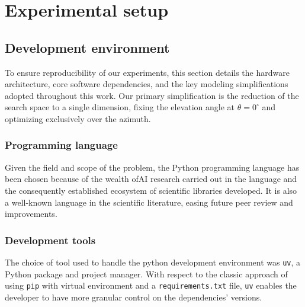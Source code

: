
\chapter{Experimental setup}
\label{cap:chapter3}


\section{Development environment}

To ensure reproducibility of our experiments, this section details the hardware architecture, core software dependencies, and the key modeling simplifications adopted throughout this work. Our primary simplification is the reduction of the search space to a single dimension, fixing the elevation angle at $\theta = 0^\circ$ and optimizing exclusively over the azimuth.

\subsection{Programming language}

Given the field and scope of the problem, the Python programming language has been chosen because of the wealth of\gls{AI} research carried out in the language and the consequently established ecosystem of scientific libraries developed. It is also a well-known language in the scientific literature, easing future peer review and improvements.

\subsection{Development tools}

The choice of tool used to handle the python development environment was \texttt{uv}, a Python package and project manager. With respect to the classic approach of using \texttt{pip} with virtual environment and a \texttt{requirements.txt} file, \texttt{uv} enables the developer to have more granular control on the dependencies' versions.


